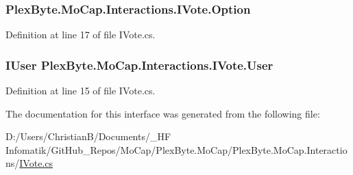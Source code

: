 \subsubsection[{\texorpdfstring{Option}{Option}}]{ Plex\+Byte.\+Mo\+Cap.\+Interactions.\+I\+Vote.\+Option\hspace{0.3cm}{\ttfamily [get]}}\hypertarget{interface_plex_byte_1_1_mo_cap_1_1_interactions_1_1_i_vote_afcfbb875e80fb14db21e6880e42984e9}{}\label{interface_plex_byte_1_1_mo_cap_1_1_interactions_1_1_i_vote_afcfbb875e80fb14db21e6880e42984e9}


Definition at line 17 of file I\+Vote.\+cs.

\subsubsection[{\texorpdfstring{User}{User}}]{\setlength{\rightskip}{0pt plus 5cm}I\+User Plex\+Byte.\+Mo\+Cap.\+Interactions.\+I\+Vote.\+User\hspace{0.3cm}{\ttfamily [get]}}\hypertarget{interface_plex_byte_1_1_mo_cap_1_1_interactions_1_1_i_vote_a9c352cab0ad680e356283c967c3b8a1e}{}\label{interface_plex_byte_1_1_mo_cap_1_1_interactions_1_1_i_vote_a9c352cab0ad680e356283c967c3b8a1e}


Definition at line 15 of file I\+Vote.\+cs.



The documentation for this interface was generated from the following file\+:\begin{DoxyCompactItemize}
\item 
D\+:/\+Users/\+Christian\+B/\+Documents/\+\_\+\+H\+F Infomatik/\+Git\+Hub\+\_\+\+Repos/\+Mo\+Cap/\+Plex\+Byte.\+Mo\+Cap/\+Plex\+Byte.\+Mo\+Cap.\+Interactions/\hyperlink{_i_vote_8cs}{I\+Vote.\+cs}\end{DoxyCompactItemize}
